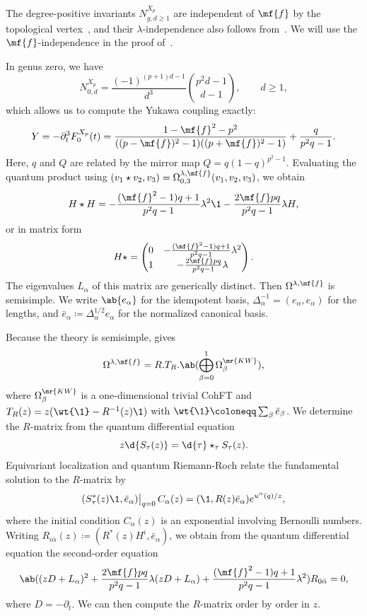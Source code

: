 \begin{rmk}
    The degree-positive invariants \(N^{X_p}_{g,d\geq1}\) are independent of \(\mf{f}\) by the topological vertex~\cite{LLLZ2009}, and their \(\lambda\)-independence also follows from~. We will use the \(\mf{f}\)-independence in the proof of~.
\end{rmk}

In genus zero, we have
\[ N^{X_p}_{0,d} = \frac{(-1)^{(p+1)d-1}}{d^3}\binom{p^2d-1}{d-1}, \qquad d \geq 1, \]
which allows us to compute the Yukawa coupling exactly:
\[ Y = -\partial_t^3 F_0^{X_p}(t) = \frac{1-\mf{f}^2-p^2}{((p-\mf{f})^2-1)((p+\mf{f})^2-1)} + \frac{q}{p^2q-1}. \]
Here, \(q\) and \(Q\) are related by the mirror map \(Q = q(1-q)^{p^2-1}\). Evaluating the quantum product using \((v_1 \star v_2, v_3) = \Omega^{\lambda,\mf{f}}_{0,3}(v_1,v_2,v_3)\), we obtain
\[ H \star H = -\frac{(\mf{f}^2-1)q+1}{p^2q-1}\lambda^2 \1 - \frac{2\mf{f}pq}{p^2q-1}\lambda H, \]
or in matrix form
\[ H \star = \begin{pmatrix} 0 & -\frac{(\mf{f}^2-1)q+1}{p^2q-1}\lambda^2 \\ 1 & -\frac{2\mf{f}pq}{p^2q-1}\lambda \end{pmatrix}. \]
The eigenvalues \(L_{\alpha}\) of this matrix are generically distinct. Then \(\Omega^{\lambda,\mf{f}}\) is semisimple. We write \(\ab\{e_{\alpha}\}\) for the idempotent basis, \(\Delta_{\alpha}^{-1} = (e_{\alpha},e_{\alpha})\) for the lengths, and \(\bar{e}_{\alpha} \coloneqq \Delta_{\alpha}^{1/2}e_{\alpha}\) for the normalized canonical basis.

Because the theory is semisimple,  gives
\[ \Omega^{\lambda,\mf{f}} = R.T_R.\ab(\bigoplus_{\beta=0}^1 \Omega^{\mr{KW}}_{\beta}), \]
where \(\Omega^{\mr{KW}}_{\beta}\) is a one-dimensional trivial CohFT and \(T_R(z) = z(\wt{\1}-R^{-1}(z)\1)\) with \(\wt{\1} \coloneqq \sum_{\beta}\bar{e}_{\beta}\). We determine the \(R\)-matrix from the quantum differential equation
\[ z \d{S_{\tau}(z)} = \d{\tau} \star_{\tau} S_{\tau}(z). \]
Equivariant localization and quantum Riemann-Roch relate the fundamental solution to the \(R\)-matrix by
\[ (S^*_{\tau}(z)\1, \bar{e}_{\alpha})\big|_{q=0}\, C_{\alpha}(z) = (\1, R(z)\bar{e}_{\alpha})e^{u^{\alpha}(q)/z}, \]
where the initial condition \(C_{\alpha}(z)\) is an exponential involving Bernoulli numbers. Writing \(R_{i\bar{\alpha}}(z) \coloneqq (R^*(z)H^i, \bar{e}_{\alpha})\), we obtain from the quantum differential equation the second-order equation
\[ \ab( (zD+L_{\alpha})^2 + \frac{2\mf{f}pq}{p^2q-1}\lambda(zD+L_{\alpha}) + \frac{(\mf{f}^2-1)q+1}{p^2q-1}\lambda^2 )R_{0\bar{\alpha}} = 0, \]
where \(D = -\partial_t\). We can then compute the \(R\)-matrix order by order in \(z\).


